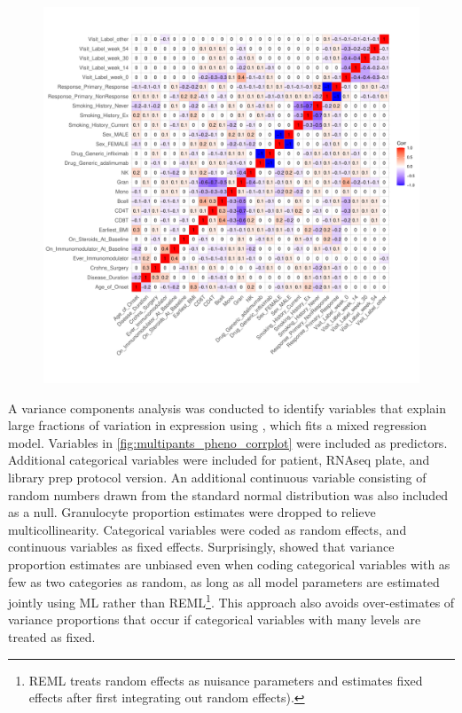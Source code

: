 \begin{outline}
\begin{figure}
    \centering
    \includegraphics[width=1.0\textwidth,page=1]{mainmatter/figures/chapter_04/process_pheno.pheno_filtered_dge.ggcorrplot.pdf}
    \caption{}
    \label{fig:multipants_pheno_corrplot}
\end{figure}

A variance components analysis was conducted to identify variables that explain large fractions of variation in expression
using \autocite{hoffman2016VariancePartitionInterpretingDrivers}, which fits a mixed regression model.
Variables in \autoref{fig:multipants_pheno_corrplot} were included as predictors.
Additional categorical variables were included for patient, \gls{RNAseq} plate, and library prep protocol version.
An additional continuous variable consisting of random numbers drawn from the standard normal distribution was also included as a null.
Granulocyte proportion estimates were dropped to relieve multicollinearity.
Categorical variables were coded as random effects, and continuous variables as fixed effects.
Surprisingly, \textcite{hoffman2016VariancePartitionInterpretingDrivers} showed that variance proportion estimates are unbiased even when coding categorical variables with as few as two categories as random, 
as long as all model parameters are estimated jointly using \gls{ML} rather than \gls{REML}\footnote{
    \gls{REML} treats random effects as nuisance parameters and estimates fixed effects after first integrating out random effects).
}.
This approach also avoids over-estimates of variance proportions that occur if categorical variables with many levels are treated as fixed.


\end{outline}
